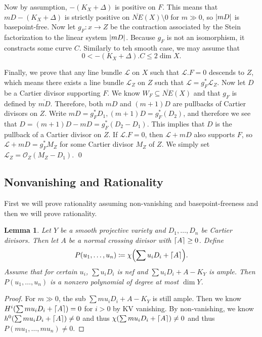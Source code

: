 \documentclass[leqno, openany]{memoir}
\DeclarePairedDelimiter{\ceil}{\lceil}{\rceil}
\newtheorem{lem}[thm]{Lemma}
\theoremstyle{definition}
\theoremstyle{remark}
\theoremstyle{plain}
\theoremstyle{definition}
\theoremstyle{remark}
\newcommand{\mc}[1]{\mathcal{#1}}
\newcommand{\ol}[1]{\overline{#1}}
\begin{document}
Now by assumption, $-(K_X + \Delta)$ is positive on $F$. This means that $mD - (K_X + \Delta)$ is strictly positive on $\ol{NE}(X) \setminus \qty{0}$ for $m \gg 0$, so $\abs{mD}$ is basepoint-free. Now let $g_F \colon x \to Z$ be the contraction associated by the Stein factorization to the linear system $\abs{mD}$. Because $g_F$ is not an isomorphism, it constracts some curve $C$. Similarly to teh smooth case, we may assume that
\[ 0 < -(K_X + \Delta).C \leq 2 \dim X. \]

Finally, we prove that any line bundle $\mc{L}$ on $X$ such that $\mc{L}.F = 0$ descends to $Z$, which means there exists a line bundle $\mc{L}_Z$ on $Z$ such that $\mc{L} = g_F^* \mc{L}_Z$. Now let $D$ be a Cartier divisor supporting $F$. We know $W_F \subseteq \ol{NE}(X)$ and that $g_F$ is defined by $\ol{mD}$. Therefore, both $mD$ and $(m+1)D$ are pullbacks of Cartier divisors on $Z$. Write $mD = g_F^* D_1, (m+1)D = g_F^*(D_2)$, and therefore we see that $D = (m+1)D - mD = g_F^* (D_2 - D_1)$. This implies that $D$ is the pullback of a Cartier divisor on $Z$. If $\mc{L}.F = 0$, then $\mc{L} + mD$ also supports $F$, so $\mc{L} + mD = g_F^* M_Z$ for some Cartier divisor $M_Z$ of $Z$. We simply set $\mc{L}_Z = \mc{O}_Z(M_Z - D_1)$. \qed

\subsection{Nonvanishing and Rationality}%
\label{sub:nonvanishing_and_rationality}

First we will prove rationality assuming non-vanishing and basepoint-freeness and then we will prove rationality.

\begin{lem}
    Let $Y$ be a smooth projective variety and $D_1, \ldots, D_n$ be Cartier divisors. Then let $A$ be a normal crossing divisor with $\ceil{A} \geq 0$. Define
    \[ P(u_1, \ldots, u_n) \coloneqq \chi \qty(\sum u_i D_i + \ceil{A}). \]
    Assume that for certain $u_i$, $\sum u_i D_i$ is nef and $\sum u_i D_i + A - K_Y$ is ample. Then $P(u_1, \ldots, u_n)$ is a nonzero polynomial of degree at most $\dim Y$.
\end{lem}

\begin{proof}
    For $m \gg 0$, the sub $\sum m u_i D_i + A - K_Y$ is still ample. Then we know $H^i\qty(\sum m u_i D_i + \ceil{A}) = 0$ for $i > 0$ by KV vanishing. By non-vanishing, we know $h^0\qty(\sum m u_i D_i + \ceil{A}) \neq 0$ and thus $\chi\qty(\sum mu_i D_i + \ceil{A}) \neq 0$ and thus $P(mu_1, \ldots, mu_n) \neq 0$.
\end{proof}
\end{document}

